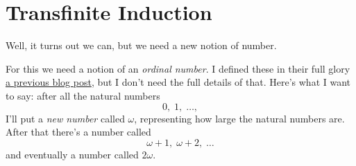 \section{Transfinite Induction}
Well, it turns out we can, but we need a new notion of number.

For this we need a notion of an \emph{ordinal number}.
I defined these in their full glory
\href{https://usamo.wordpress.com/2014/11/18/set-theory-part-2-constructing-the-ordinals/}%
{a previous blog post}, but I don't need the full details of that.
Here's what I want to say:
after all the natural numbers 
\[ 0, \; 1, \; \dots, \]
I'll put a \emph{new number} called $\omega$, representing how large the natural numbers are.
After that there's a number called 
\[\omega+1, \; \omega+2, \; \dots \]
and eventually a number called $2\omega$.

